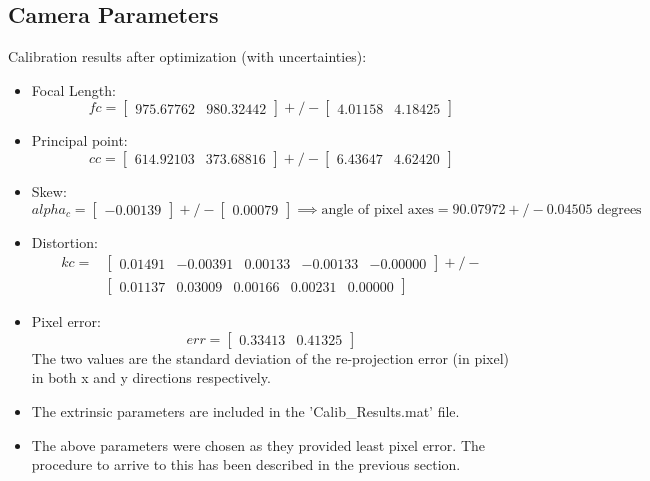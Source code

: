 \documentclass[10pt,a4paper]{article}
\begin{document}
		\subsection{Camera Parameters}
			Calibration results after optimization (with uncertainties):
			\begin{itemize}
				\item Focal Length: $$fc = 
					\begin{bmatrix}975.67762 & 980.32442\end{bmatrix}  +/- 
					\begin{bmatrix}4.01158 &  4.18425 \end{bmatrix} $$
				\item Principal point: $$cc = 
					\begin{bmatrix} 614.92103 &  373.68816\end{bmatrix}  +/- 
					\begin{bmatrix}6.43647 &  4.62420 \end{bmatrix} $$
				\item Skew: $$alpha_c = 
					\begin{bmatrix}  -0.00139 \end{bmatrix}  +/- 
					\begin{bmatrix}0.00079 \end{bmatrix} \implies  \text{angle of pixel axes} = 90.07972 +/- 0.04505 \text{ degrees}$$
				\item Distortion: 
					\begin{align*}
					kc = 
					&\begin{bmatrix}0.01491 &  -0.00391  & 0.00133  & -0.00133 & -0.00000 \end{bmatrix}  +/- \\
					&\begin{bmatrix}0.01137  & 0.03009  & 0.00166  & 0.00231 & 0.00000  \end{bmatrix}
					\end{align*}
				\item Pixel error: $$err = 
					\begin{bmatrix}   0.33413 &  0.41325  \end{bmatrix}
					$$
					The two values are the standard deviation of the re-projection error (in pixel) in both x and y directions respectively.
				\item The extrinsic parameters are included in the 'Calib\_Results.mat' file.
				\item The above parameters were chosen as they provided least pixel error. The procedure to arrive to this has been described in the previous section.
			\end{itemize}	
	
	
\end{document}

